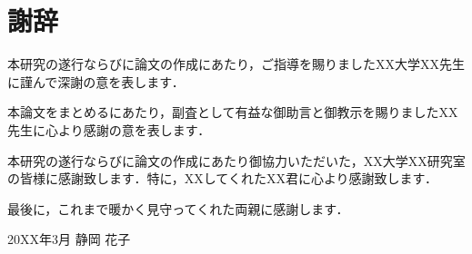\section*{謝辞}

本研究の遂行ならびに論文の作成にあたり，ご指導を賜りましたXX大学XX先生に謹んで深謝の意を表します．

本論文をまとめるにあたり，副査として有益な御助言と御教示を賜りましたXX先生に心より感謝の意を表します．

本研究の遂行ならびに論文の作成にあたり御協力いただいた，XX大学XX研究室の皆様に感謝致します．特に，XXしてくれたXX君に心より感謝致します．

最後に，これまで暖かく見守ってくれた両親に感謝します．


\begin{flushright}
20XX年3月 静岡 花子
\end{flushright}
